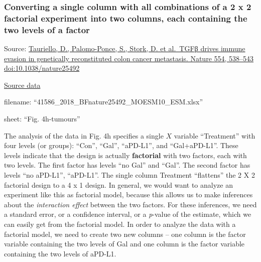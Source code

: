 \documentclass[]{book}
\begin{document}
\hypertarget{converting-a-single-column-with-all-combinations-of-a-2-x-2-factorial-experiment-into-two-columns-each-containing-the-two-levels-of-a-factor}{%
\subsubsection{Converting a single column with all combinations of a 2 x 2 factorial experiment into two columns, each containing the two levels of a factor}\label{converting-a-single-column-with-all-combinations-of-a-2-x-2-factorial-experiment-into-two-columns-each-containing-the-two-levels-of-a-factor}}

Source: \href{2018}{Tauriello, D., Palomo-Ponce, S., Stork, D. et al.~TGFβ drives immune evasion in genetically reconstituted colon cancer metastasis. Nature 554, 538--543} \url{doi:10.1038/nature25492}

\href{https://www.nature.com/articles/nature25492\#Sec23}{Source data}

filename: ``41586\_2018\_BFnature25492\_MOESM10\_ESM.xlsx''

sheet: ``Fig. 4h-tumours''

The analysis of the data in Fig. 4h specifies a single \(X\) variable ``Treatment'' with four levels (or groups): ``Con'', ``Gal'', ``aPD-L1'', and ``Gal+aPD-L1''. These levels indicate that the design is actually \textbf{factorial} with two factors, each with two levels. The first factor has levels ``no Gal'' and ``Gal''. The second factor has levels ``no aPD-L1'', ``aPD-L1''. The single column Treatment ``flattens'' the 2 X 2 factorial design to a 4 x 1 design. In general, we would want to analyze an experiment like this as factorial model, because this allows us to make inferences about the \emph{interaction effect} between the two factors. For these inferences, we need a standard error, or a confidence interval, or a \emph{p}-value of the estimate, which we can easily get from the factorial model. In order to analyze the data with a factorial model, we need to create two new columns -- one column is the factor variable containing the two levels of Gal and one column is the factor variable containing the two levels of aPD-L1.
\end{document}
